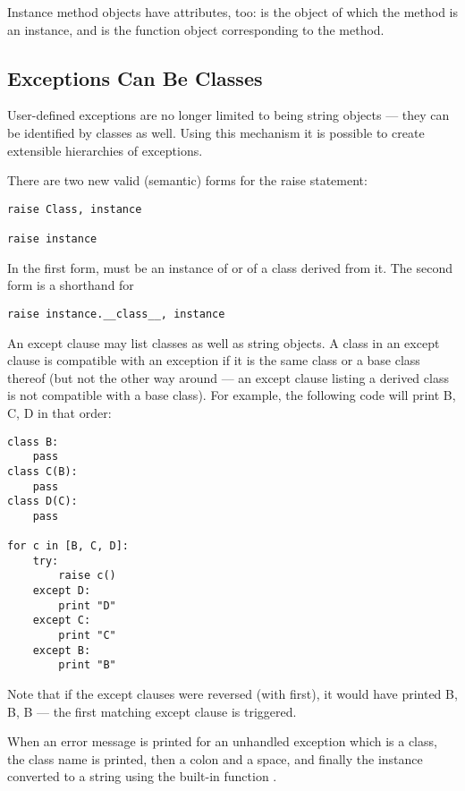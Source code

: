 \documentclass{manual}
\begin{document}
Instance method objects have attributes, too:  is the
object of which the method is an instance, and  is the
function object corresponding to the method.

\subsection{Exceptions Can Be Classes \label{exceptionClasses}}

User-defined exceptions are no longer limited to being string objects
--- they can be identified by classes as well.  Using this mechanism it
is possible to create extensible hierarchies of exceptions.

There are two new valid (semantic) forms for the raise statement:

\begin{verbatim}
raise Class, instance

raise instance
\end{verbatim}

In the first form,  must be an instance of 
or of a class derived from it.  The second form is a shorthand for

\begin{verbatim}
raise instance.__class__, instance
\end{verbatim}

An except clause may list classes as well as string objects.  A class
in an except clause is compatible with an exception if it is the same
class or a base class thereof (but not the other way around --- an
except clause listing a derived class is not compatible with a base
class).  For example, the following code will print B, C, D in that
order:

\begin{verbatim}
class B:
    pass
class C(B):
    pass
class D(C):
    pass

for c in [B, C, D]:
    try:
        raise c()
    except D:
        print "D"
    except C:
        print "C"
    except B:
        print "B"
\end{verbatim}

Note that if the except clauses were reversed (with
 first), it would have printed B, B, B --- the first
matching except clause is triggered.

When an error message is printed for an unhandled exception which is a
class, the class name is printed, then a colon and a space, and
finally the instance converted to a string using the built-in function
.
\end{document}
